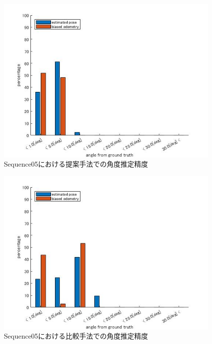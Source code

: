 \begin{figure}[htbp]
  \begin{minipage}{1.0\hsize}
  \begin{center}
   \includegraphics[width=110mm]{./picture/mesh_s5_rpy.jpg}
  \end{center}
  \caption{Sequence05における提案手法での角度推定精度}
  \label{fig:mesh_sequence05_RPY}
 \end{minipage}
\end{figure}

\begin{figure}[htbp]
 \begin{minipage}{1.0\hsize}
  \begin{center}
   \includegraphics[width=110mm]{./picture/point_s5_rpy.jpg}
  \end{center}
  \caption{Sequence05における比較手法での角度推定精度}
  \label{fig:point_sequence05_RPY}
 \end{minipage}
\end{figure}

